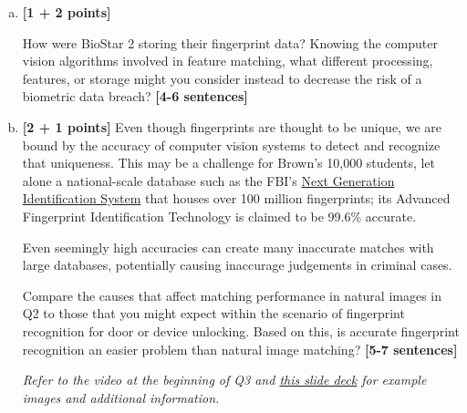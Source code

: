 \documentclass[11pt]{article}
\begin{document}
\begin{enumerate}[(a)]
    \item \textbf{[1 + 2 points]}
    \begin{tcolorbox}[colback=orange!5!white,colframe=orange!75!black]
    How were BioStar 2 storing their fingerprint data? Knowing the computer vision algorithms involved in feature matching, what different processing, features, or storage might you consider instead to decrease the risk of a biometric data breach? \textbf{[4-6 sentences]}
    \end{tcolorbox}


    \pagebreak
    \item 
    \textbf{[2 + 1 points]}
Even though fingerprints are thought to be unique, we are bound by the accuracy of computer vision systems to detect and recognize that uniqueness.
This may be a challenge for Brown's 10,000 students, let alone a national-scale database such as the FBI's \href{https://www.fbi.gov/services/cjis/fingerprints-and-other-biometrics/ngi}{Next Generation Identification System} that houses over 100 million fingerprints; its Advanced Fingerprint Identification Technology is claimed to be 99.6\% accurate.

Even seemingly high accuracies can create many inaccurate matches with large databases, potentially causing inaccurage judgements in criminal cases. 

    \begin{tcolorbox}[colback=orange!5!white,colframe=orange!75!black]
    Compare the causes that affect matching performance in natural images in Q2 to those that you might expect within the scenario of fingerprint recognition for door or device unlocking. Based on this, is accurate fingerprint recognition an easier problem than natural image matching? \textbf{[5-7 sentences]}

    \emph{Refer to the video at the beginning of Q3 and \href{http://biometrics.cse.msu.edu/Presentations/AnilJain_UniquenessOfFingerprints_NAS05.pdf}{this slide deck} for example images and additional information.}
    \end{tcolorbox}


\end{enumerate}
\end{document}
